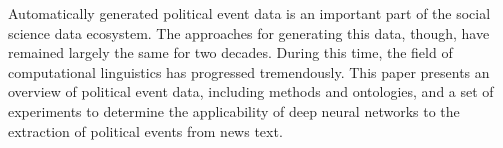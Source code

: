 Automatically generated political event data is an important part of the social science data ecosystem. The approaches for generating this data, though, have remained largely the same for two decades. During this time, the field of computational linguistics has progressed tremendously. This paper presents an overview of political event data, including methods and ontologies, and a set of experiments to determine the applicability of deep neural networks to the extraction of political events from news text.
